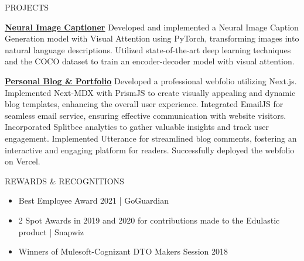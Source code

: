 \documentclass{resume} %
\begin{document}

\begin{rSection}{PROJECTS}
\vspace{-1.25em}

\item \textbf{\href{https://github.com/Prajwal-S-Venkatesh/image-captioner}{Neural Image Captioner}} {Developed and implemented a Neural Image Caption Generation model with Visual Attention using PyTorch, transforming images into natural language descriptions. Utilized state-of-the-art deep learning techniques and the COCO dataset to train an encoder-decoder model with visual attention.}

\item \textbf{\href{https://www.prajwalsv.dev}{Personal Blog \& Portfolio}} {Developed a professional webfolio utilizing Next.js. Implemented Next-MDX with PrismJS to create visually appealing and dynamic blog templates, enhancing the overall user experience. Integrated EmailJS for seamless email service, ensuring effective communication with website visitors. Incorporated Splitbee analytics to gather valuable insights and track user engagement. Implemented Utterance for streamlined blog comments, fostering an interactive and engaging platform for readers. Successfully deployed the webfolio on Vercel. }

\end{rSection} 

\begin{rSection}{REWARDS \& RECOGNITIONS} 
\begin{itemize}
    \item 	Best Employee Award 2021 | GoGuardian
    \item	2 Spot Awards in 2019 and 2020 for contributions made to the Edulastic product | Snapwiz
    \item 	Winners of Mulesoft-Cognizant DTO Makers Session 2018
\end{itemize}
\end{rSection}

\end{document}
